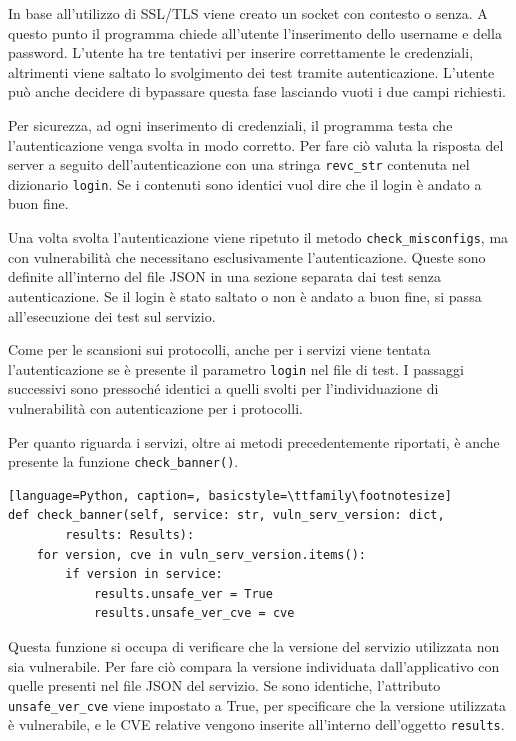 \documentclass[12pt]{report}
\begin{document}
In base all'utilizzo di SSL/TLS viene creato un socket con contesto o senza. A questo punto il programma chiede all'utente l'inserimento dello username e della password. L'utente ha tre tentativi per inserire correttamente le credenziali, altrimenti viene saltato lo svolgimento dei test tramite autenticazione. L'utente può anche decidere di bypassare questa fase lasciando vuoti i due campi richiesti. 

Per sicurezza, ad ogni inserimento di credenziali, il programma testa che l'autenticazione venga svolta in modo corretto. Per fare ciò valuta la risposta del server a seguito dell'autenticazione con una stringa \lstinline{revc_str} contenuta nel dizionario \lstinline{login}. Se i contenuti sono identici vuol dire che il login è andato a buon fine.

Una volta svolta l'autenticazione viene ripetuto il metodo \lstinline{check_misconfigs}, ma con vulnerabilità che necessitano esclusivamente l'autenticazione. Queste sono definite all'interno del file JSON in una sezione separata dai test senza autenticazione. Se il login è stato saltato o non è andato a buon fine, si passa all'esecuzione dei test sul servizio.

Come per le scansioni sui protocolli, anche per i servizi viene tentata l'autenticazione se è presente il parametro \lstinline{login} nel file di test. I passaggi successivi sono pressoché identici a quelli svolti per l'individuazione di vulnerabilità con autenticazione per i protocolli.

Per quanto riguarda i servizi, oltre ai metodi precedentemente riportati, è anche presente la funzione \lstinline{check_banner()}.
\begin{lstlisting}[language=Python, caption=, basicstyle=\ttfamily\footnotesize]
def check_banner(self, service: str, vuln_serv_version: dict,   
        results: Results):
    for version, cve in vuln_serv_version.items():
        if version in service:
            results.unsafe_ver = True
            results.unsafe_ver_cve = cve
\end{lstlisting}

Questa funzione si occupa di verificare che la versione del servizio utilizzata non sia vulnerabile. Per fare ciò compara la versione individuata dall'applicativo con quelle presenti nel file JSON del servizio. Se sono identiche, l'attributo \lstinline{unsafe_ver_cve} viene impostato a True, per specificare che la versione utilizzata è vulnerabile, e le CVE relative vengono inserite all'interno dell'oggetto \lstinline{results}.
\end{document}
